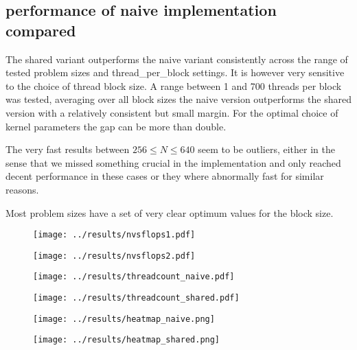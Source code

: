 \documentclass[11pt,twoside,a4paper]{scrartcl}
\begin{document}
\subsection{performance of naive implementation compared}

The shared variant outperforms the naive variant consistently across the range of tested problem sizes and thread\_per\_block settings. It is however very sensitive to the choice of thread block size. A range between 1 and 700 threads per block was tested, averaging over all block sizes the naive version outperforms the shared version with a relatively consistent but small margin. For the optimal choice of kernel parameters the gap can be more than double. 

The very fast results between $256 \le N \le 640$ seem to be outliers, either in the sense that we missed something crucial in the implementation and only reached decent performance in these cases or they where abnormally fast for similar reasons.

Most problem sizes have a set of very clear optimum values for the block size.

\begin{figure}
    \centering
    \texttt{[image: ../results/nvsflops1.pdf]}
\end{figure}
\begin{figure}
    \centering
    \texttt{[image: ../results/nvsflops2.pdf]}
\end{figure}
\begin{figure}
    \centering
    \texttt{[image: ../results/threadcount\_naive.pdf]}
\end{figure}
\begin{figure}
    \centering
    \texttt{[image: ../results/threadcount\_shared.pdf]}
\end{figure}

\begin{figure}
    \centering
    \texttt{[image: ../results/heatmap\_naive.png]}
\end{figure}
\begin{figure}
    \centering
    \texttt{[image: ../results/heatmap\_shared.png]}
\end{figure}
\end{document}
